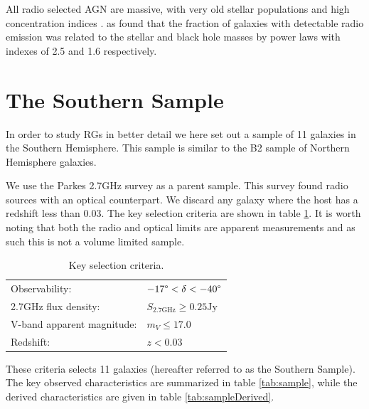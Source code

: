 			All radio selected AGN are massive, with very old stellar populations and high concentration indices \citep{Best2005}. \citet{Best2005} as found that the fraction of galaxies with detectable radio emission was related to the stellar and black hole masses by power laws with indexes of 2.5 and 1.6 respectively. 

\section{The Southern Sample}
	\label{sec:Sample}
	In order to study RGs in better detail we here set out a sample of 11 galaxies in the Southern Hemisphere. This sample is similar to the B2 sample of Northern Hemisphere galaxies. 

	We use the Parkes 2.7GHz survey as a parent sample. This survey found radio sources with an optical counterpart. We discard any galaxy where the host has a redshift less than 0.03. The key selection criteria are shown in table \ref{tab:selection}. It is worth noting that both the radio and optical limits are apparent measurements and as such this is not a volume limited sample.

	\begin{table}
		\centering
		\caption{Key selection criteria.}
		\label{tab:selection}
		\begin{tabular}{l l}
			\hline
			\hline
			Observability:				& $-17\degree < \delta < -40\degree$ \\
			2.7GHz flux density: 		& $S_\text{2.7GHz} \ge 0.25 \text{Jy} $ \\
			V-band apparent magnitude: 	& $m_V \le 17.0 $ \\
			Redshift: 					& $z < 0.03$ \\			
			\hline
			\hline
		\end{tabular}
	\end{table}

	These criteria selects 11 galaxies (hereafter referred to as the Southern Sample). The key observed characteristics are summarized in table \ref{tab:sample}, while the derived characteristics are given in table \ref{tab:sampleDerived}.

